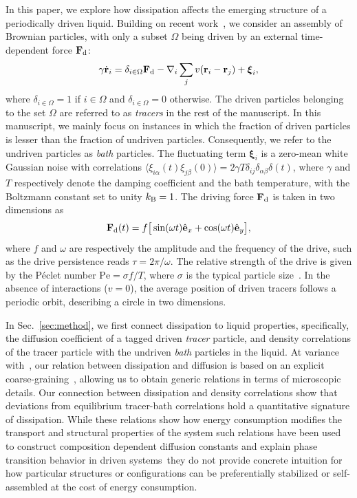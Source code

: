 \documentclass[pre, superscriptaddress, twocolumn,pre]{revtex4-1}
\begin{document}
In this paper, we explore how dissipation affects the emerging structure of a periodically driven liquid. Building on recent work~\cite{Han2016, delJunco2018}, we consider an assembly of Brownian particles, with only a subset $\Omega$ being driven by an external time-dependent force ${\bf F}_{\rm d}$:
\begin{equation}\label{eq:dyn}
	\gamma\dot{\bf r}_i = \delta_{i\in\Omega}{\bf F}_{\rm d} - \nabla_i \sum_j v({\bf r}_i-{\bf r}_j) + {\boldsymbol\xi}_i ,
\end{equation}
where $\delta_{i\in\Omega}=1$ if $i\in\Omega$ and $\delta_{i\in\Omega}=0$ otherwise. The driven particles belonging to the set $\Omega$ are referred to as \textit{tracers} in the rest of the manuscript. In this manuscript, we mainly focus on instances in which the fraction of driven particles is lesser than the fraction of undriven particles. Consequently, we refer to the undriven particles as \textit{bath} particles. The fluctuating term ${\boldsymbol\xi}_i$ is a zero-mean white Gaussian noise with correlations $\langle\xi_{i\alpha}(t)\xi_{j\beta}(0)\rangle=2\gamma T\delta_{ij}\delta_{\alpha\beta}\delta(t)$, where $\gamma$ and $T$ respectively denote the damping coefficient and the bath temperature, with the Boltzmann constant set to unity $k_{\rm B}=1$. The driving force ${\bf F}_\text{d}$ is taken in two dimensions as
\begin{equation}\label{eq:theta}
	{\bf F}_{\rm d}(t) = f \big[\sin(\omega t) \hat{\bf e}_x + \cos(\omega t)\hat{\bf e}_y \big] ,
\end{equation}
where $f$ and $\omega$ are respectively the amplitude and the frequency of the drive, such as the drive persistence reads $\tau=2\pi/\omega$. The relative strength of the drive is given by the P\'eclet number $\text{Pe} = \sigma f/T$, where $\sigma$ is the typical particle size~\cite{Han2016, delJunco2018}. In the absence of interactions ($v=0$), the average position of driven tracers follows a periodic orbit, describing a circle in two dimensions.


In Sec.~\ref{sec:method}, we first connect dissipation to liquid properties, specifically, the diffusion coefficient of a tagged driven \textit{tracer} particle, and density correlations of the tracer particle with the undriven \textit{bath} particles in the liquid. At variance with~\cite{delJunco2018}, our relation between dissipation and diffusion is based on an explicit coarse-graining~\cite{Dean1996, Demery2011, Demery2014}, allowing us to obtain generic relations in terms of microscopic details. Our connection between dissipation and density correlations show that deviations from equilibrium tracer-bath correlations hold a quantitative signature of dissipation. While these relations show how energy consumption modifies the transport and structural properties of the system \textendash such relations have been used to construct composition dependent diffusion constants and explain phase transition behavior in driven systems~\cite{delJunco2018}\textendash  they do not provide concrete intuition for how particular structures or configurations can be preferentially stabilized or self-assembled at the cost of energy consumption.
\end{document}

